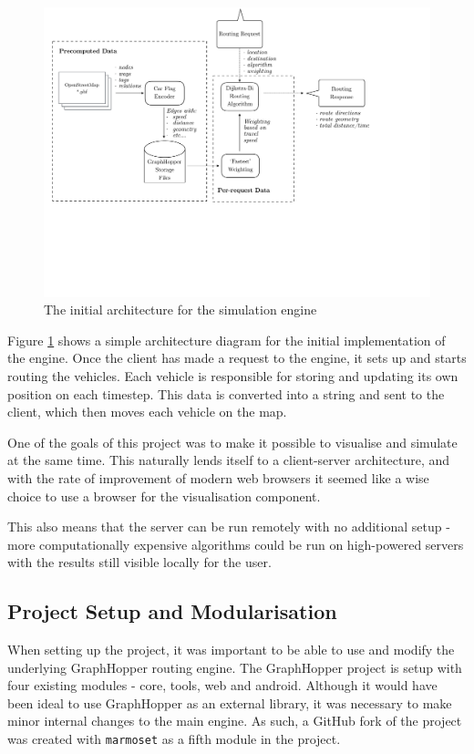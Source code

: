 \documentclass[ %
                    author={Alexander Hill},
                supervisor={Dr. Benjamin Sach},
                    degree={MEng},
                     title={MARMOSET},
                  subtitle={Multi-Agent Route Management using Online Simulation for Efficient Transportation},
                      type={research},
                      year={2016} ]{dissertation}
\begin{document}
\begin{figure}[h]
    \centering
    \includegraphics[scale=0.5,page=2,clip,trim=0 17cm 3cm 0]{architecture}
    \caption{The initial architecture for the simulation engine}\label{fig:init-arch}
\end{figure}

Figure \ref{fig:init-arch} shows a simple architecture diagram for the initial
implementation of the engine. Once the client has made a request to the engine,
it sets up and starts routing the vehicles. Each vehicle is responsible for
storing and updating its own position on each timestep. This data is converted
into a string and sent to the client, which then moves each vehicle on the map.

One of the goals of this project was to make it possible to visualise and
simulate at the same time. This naturally lends itself to a client-server
architecture, and with the rate of improvement of modern web browsers it seemed
like a wise choice to use a browser for the visualisation component.

This also means that the server can be run remotely with no additional setup -
more computationally expensive algorithms could be run on high-powered servers
with the results still visible locally for the user.

\subsection{Project Setup and Modularisation}

When setting up the project, it was important to be able to use and modify the
underlying GraphHopper routing engine. The GraphHopper project is setup with
four existing modules - core, tools, web and android. Although it would have
been ideal to use GraphHopper as an external library, it was necessary to make
minor internal changes to the main engine. As such, a GitHub fork of the project
was created with \texttt{marmoset} as a fifth module in the project.
\end{document}
